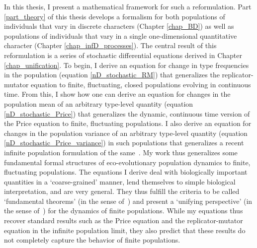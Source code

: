In this thesis, I present a mathematical framework for such a reformulation. Part \ref{part_theory} of this thesis develops a formalism for both populations of individuals that vary in discrete characters (Chapter \ref{chap_BD}) as well as populations of individuals that vary in a single one-dimensional quantitative character (Chapter \ref{chap_infD_processes}). The central result of this reformulation is a series of stochastic differential equations derived in Chapter \ref{chap_unification}. To begin, I derive an equation for change in type frequencies in the population (equation \eqref{nD_stochastic_RM}) that generalizes the replicator-mutator equation to finite, fluctuating, closed populations evolving in continuous time. From this, I show how one can derive an equation for changes in the population mean of an arbitrary type-level quantity (equation \eqref{nD_stochastic_Price}) that generalizes the dynamic, continuous time version of the Price equation to finite, fluctuating populations. I also derive an equation for changes in the population variance of an arbitrary type-level quantity (equation \eqref{nD_stochastic_Price_variance}) in such populations that generalizes a recent infinite population formulation of the same~\citep{lion_theoretical_2018}. My work thus generalizes some fundamental formal structures of eco-evolutionary population dynamics to finite, fluctuating populations. The equations I derive deal with biologically important quantities in a `coarse-grained' manner, lend themselves to simple biological interpretation, and are very general. They thus fulfill the criteria to be called `fundamental theorems' (in the sense of~\cite{queller_fundamental_2017}) and present a `unifying perspective' (in the sense of~\cite{lion_theoretical_2018}) for the dynamics of finite populations. While my equations thus recover standard results such as the Price equation and the replicator-mutator equation in the infinite population limit, they also predict that these results do not completely capture the behavior of finite populations.

